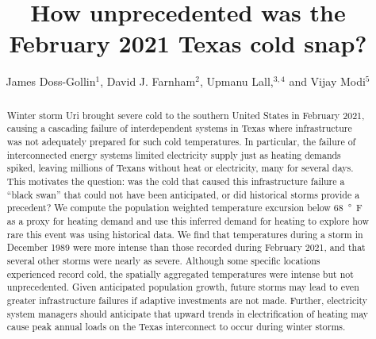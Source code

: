 \documentclass[12pt]{iopart}
\begin{document}
\title[PREPRINT by Doss-Gollin, Farnham, Lall, and Modi]{How unprecedented was the February 2021 Texas cold snap?}

\author{James Doss-Gollin$^1$, David J. Farnham$^2$, Upmanu Lall,$^{3,4}$ and Vijay Modi$^5$}
\address{$^1$ Department of Civil and Environmental Engineering, Rice University, Houston, TX, USA (ORCID 0000-0002-3428-2224)}
\address{$^2$ Department of Global Ecology, Carnegie Institution for Science, Stanford, CA, USA (ORCID 0000-0002-6690-4251)}
\address{$^3$ Columbia Water Center, Columbia University, New York, NY, USA (ORCID 0000-0003-0529-8128)}
\address{$^4$ Department of Earth and Environmental Engineering, Columbia University, New York, NY, USA}
\address{$^4$ Department of Mechanical Engineering, Columbia University, New York, NY, USA (ORCID 0000-0003-2513-0437)}
\vspace{10pt}

\begin{abstract}
  Winter storm Uri brought severe cold to the southern United States in February 2021, causing a cascading failure of interdependent systems in Texas where infrastructure was not adequately prepared for such cold temperatures.
  In particular, the failure of interconnected energy systems limited electricity supply just as heating demands spiked, leaving millions of Texans without heat or electricity, many for several days.
  This motivates the question: was the cold that caused this infrastructure failure a ``black swan'' that could not have been anticipated, or did historical storms provide a precedent?
  We compute the population weighted temperature excursion below \SI{68}{\degree F} as a proxy for heating demand and use this inferred demand for heating to explore how rare this event was using historical data.
  We find that temperatures during a storm in December 1989 were more intense than those recorded during February 2021, and that several other storms were nearly as severe.
  Although some specific locations experienced record cold, the spatially aggregated temperatures were intense but not unprecedented.
  Given anticipated population growth, future storms may lead to even greater infrastructure failures if adaptive investments are not made.
  Further, electricity system managers should anticipate that upward trends in electrification of heating may cause peak annual loads on the Texas interconnect to occur during winter storms.

\end{abstract}
\end{document}
